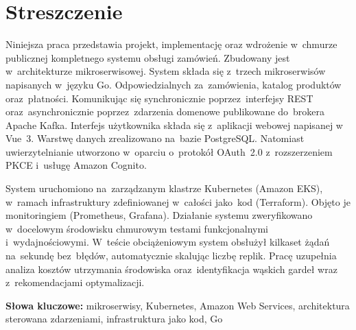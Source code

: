 \documentclass[12pt,a4paper]{report}
\begin{document}
\setcounter{page}{2}

\chapter*{Streszczenie}

Niniejsza praca przedstawia projekt, implementację oraz wdrożenie w~chmurze publicznej kompletnego systemu obsługi
zamówień. Zbudowany jest w~architekturze mikroserwisowej. System składa się z~trzech mikroserwisów napisanych
w~języku Go. Odpowiedzialnych za~zamówienia, katalog produktów oraz~płatności. Komunikując się
synchronicznie poprzez~interfejsy REST oraz~asynchronicznie poprzez~zdarzenia domenowe publikowane do~brokera
Apache Kafka. Interfejs użytkownika składa się z~aplikacji webowej napisanej w Vue~3. Warstwę danych zrealizowano
na~bazie PostgreSQL. Natomiast uwierzytelnianie utworzono w~oparciu o~protokół OAuth~2.0 z~rozszerzeniem PKCE i~usługę Amazon
Cognito.

System uruchomiono na~zarządzanym klastrze Kubernetes (Amazon EKS), w~ramach infrastruktury zdefiniowanej
w~całości jako~kod (Terraform). Objęto je monitoringiem (Prometheus, Grafana). 
Działanie systemu zweryfikowano w~docelowym środowisku chmurowym testami funkcjonalnymi
i~wydajnościowymi. W~teście obciążeniowym system obsłużył kilkaset żądań na~sekundę bez~błędów, automatycznie
skalując liczbę replik. Pracę uzupełnia analiza kosztów utrzymania środowiska oraz~identyfikacja wąskich gardeł
wraz z~rekomendacjami optymalizacji.

\noindent\textbf{Słowa kluczowe:} mikroserwisy, Kubernetes, Amazon Web Services, architektura sterowana
zdarzeniami, infrastruktura jako kod, Go

\clearpage


\tableofcontents
\clearpage











\end{document}

